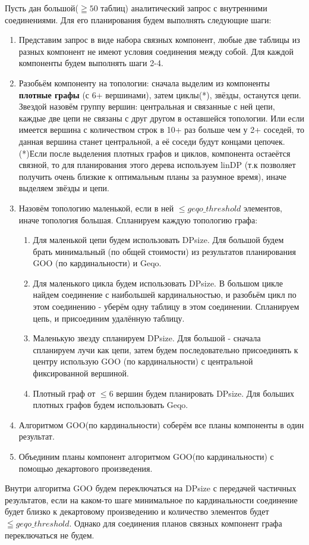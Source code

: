 \documentclass[12pt]{article}
\begin{document}
\begin{flushleft}
Пусть дан большой($\geqq 50$ таблиц) аналитический запрос с внутренними соединениями. Для его планирования будем выполнять 
следующие шаги:
\begin{enumerate}
    \item Представим запрос в виде набора связных компонент, любые две таблицы из разных компонент не имеют условия соединения между собой. 
Для каждой компоненты будем выполнять шаги 2-4.
    \item Разобьём компоненту на топологии: сначала выделим из компоненты \textbf{плотные графы} (с 6+ вершинами), затем циклы(*), звёзды, останутся цепи. 
Звездой назовём группу вершин: центральная и связанные с ней цепи, каждые две цепи не связаны с друг другом в оставшейся топологии. Или если имеется 
вершина с количеством строк в 10+ раз больше чем у 2+ соседей, то данная вершина станет центральной, а её соседи будут концами цепочек.\newline (*)Если после выделения 
плотных графов и циклов, компонента остаеётся связной, то для планирования этого дерева используем linDP (т.к позволяет получить очень близкие к оптимальным планы за разумное время), иначе выделяем звёзды и цепи.
    \item Назовём топологию маленькой, если в ней $\leq geqo\_threshold$ элементов, иначе топология большая. Спланируем каждую топологию графа:\newline
    \begin{enumerate}
        \item Для маленькой цепи будем использовать DPsize. Для большой будем брать минимальный (по общей стоимости) из результатов планирования 
        GOO (по кардинальности) и Geqo.
        \item Для маленького цикла будем использовать DPsize. В большом цикле найдем соединение с наибольшей кардинальностью, и разобьём цикл 
        по этом соединению - уберём одну таблицу в этом соединении. Спланируем цепь, и присоединим удалённую таблицу.
        \item Маленькую звезду спланируем DPsize. Для большой - сначала спланируем лучи как цепи, затем будем последовательно присоединять к 
        центру использую GOO (по кардинальности) с центральной фиксированной вершиной.
        \item Плотный граф от $\leq 6$ вершин будем планировать DPsize. Для больших плотных графов будем использовать Geqo.
    \end{enumerate}
    \item Алгоритмом GOO(по кардинальности) соберём все планы компоненты в один результат.
    \item Объединим планы компонент алгоритмом GOO(по кардинальности) с помощью декартового произведения.
\end{enumerate}

Внутри алгоритма GOO будем переключаться на DPsize с передачей частичных результатов, если на каком-то шаге минимальное по кардинальности соединение будет близко к декартовому произведению и 
количество элементов будет $\leqq geqo\_threshold$. Однако для соединения планов связных компонент графа переключаться не будем. 

\raggedright

\end{flushleft}
\end{document}
